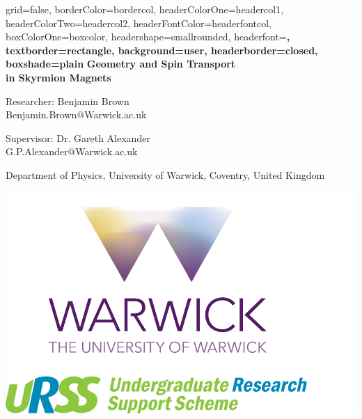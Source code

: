 \documentclass[a0paper,portrait]{baposter}
\begin{document}
\begin{poster}{
grid=false,
borderColor=bordercol, %
headerColorOne=headercol1, %
headerColorTwo=headercol2, %
headerFontColor=headerfontcol, %
boxColorOne=boxcolor, %
headershape=smallrounded, %
headerfont=\Large\sf\bf, %
textborder=rectangle,
background=user,
headerborder=closed, %
boxshade=plain
}
{}
%
%
{\vspace{-8pt}\sf\bf Geometry and Spin Transport \\ \vspace{8pt}in Skyrmion Magnets} %
{\begin{minipage}[t]{0.4\textwidth} \smaller
		Researcher: Benjamin Brown \\
		Benjamin.Brown@Warwick.ac.uk
\end{minipage}
\qquad
\begin{minipage}[t]{0.4\textwidth} \smaller
	Supervisor: Dr. Gareth Alexander \\
	G.P.Alexander@Warwick.ac.uk
\end{minipage}
\vspace{2mm}

{\smaller Department of Physics, University of Warwick, Coventry, United Kingdom}} %
{\includegraphics[scale=0.35]{UofW.pdf}} %


\end{poster}
\end{document}
